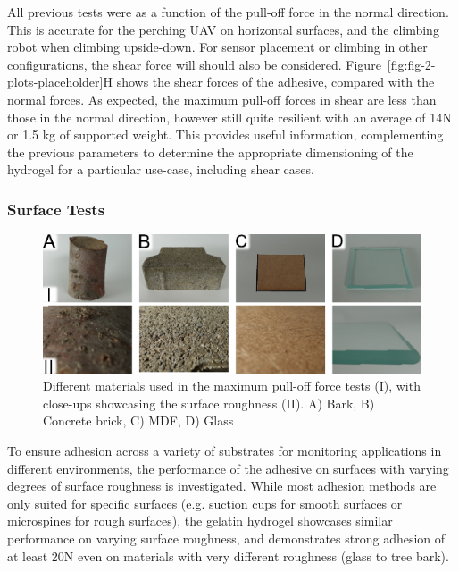 All previous tests were as a function of the pull-off force in the normal direction. This is accurate for the perching UAV on horizontal surfaces, and the climbing robot when climbing upside-down. For sensor placement or climbing in other configurations, the shear force will should also be considered. Figure~\ref{fig:fig-2-plots-placeholder}H shows the shear forces of the adhesive, compared with the normal forces. As expected, the maximum pull-off forces in shear are less than those in the normal direction, however still quite resilient with an average of 14N or 1.5 kg of supported weight. This provides useful information, complementing the previous parameters to determine the appropriate dimensioning of the hydrogel for a particular use-case, including shear cases.


\subsubsection{Surface Tests} %
\label{subsec:surface_tests}
\begin{figure}
  \includegraphics[width=\linewidth]{chapters/papers/SB/figures/fig-3-surfaces-placeholder/fig-3-surfaces.pdf}
  \caption{Different materials used in the maximum pull-off force tests (I), with close-ups showcasing the surface roughness (II). A) Bark, B) Concrete brick, C) MDF, D) Glass}
  \label{fig:fig3-placeholder}
\end{figure}

To ensure adhesion across a variety of substrates for monitoring applications in different environments, the performance of the adhesive on surfaces with varying degrees of surface roughness is investigated. While most adhesion methods are only suited for specific surfaces (e.g. suction cups for smooth surfaces or microspines for rough surfaces), the gelatin hydrogel showcases similar performance on varying surface roughness, and demonstrates strong adhesion of at least 20N even on materials with very different roughness (glass to tree bark).


